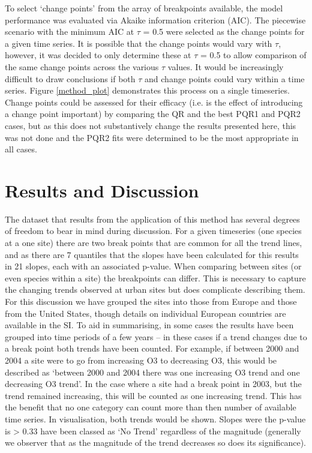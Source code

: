 \documentclass[journal abbreviation, manuscript]{copernicus}
\begin{document}
To select ‘change points’ from the array of breakpoints available, the model performance was evaluated via Akaike information criterion (AIC). The piecewise scenario with the minimum AIC at $\tau$ = 0.5 were selected as the change points for a given time series. It is possible that the change points would vary with $\tau$, however, it was decided to only determine these at $\tau$ = 0.5 to allow comparison of the same change points across the various $\tau$ values. It would be increasingly difficult to draw conclusions if both $\tau$ and change points could vary within a time series.  Figure \ref{method_plot} demonstrates this process on a single timeseries. Change points could be assessed for their efficacy (i.e. is the effect of introducing a change point important) by comparing the QR and the best PQR1 and PQR2 cases, but as this does not substantively change the results presented here, this was not done and the PQR2 fits were determined to be the most appropriate in all cases.

\clearpage
\section{Results and Discussion}
The dataset that results from the application of this method has several degrees of freedom to bear in mind during discussion. For a given timeseries (one species at a one site) there are two break points that are common for all the trend lines, and as there are 7 quantiles that the slopes have been calculated for this results in 21 slopes, each with an associated p-value. When comparing between sites (or even species within a site) the breakpoints can differ. This is necessary to capture the changing trends observed at urban sites but does complicate describing them. For this discussion we have grouped the sites into those from Europe and those from the United States, though details on individual European countries are available in the SI. 
To aid in summarising, in some cases the results have been grouped into time periods of a few years – in these cases if a trend changes due to a break point both trends have been counted. For example, if between 2000 and 2004 a site were to go from increasing O3 to decreasing O3, this would be described as ‘between 2000 and 2004 there was one increasing O3 trend and one decreasing O3 trend’. In the case where a site had a break point in 2003, but the trend remained increasing, this will be counted as one increasing trend. This has the benefit that no one category can count more than then number of available time series. In visualisation, both trends would be shown.
Slopes were the p-value is > 0.33 have been classed as ‘No Trend’ regardless of the magnitude (generally we observer that as the magnitude of the trend decreases so does its significance).
\end{document}
